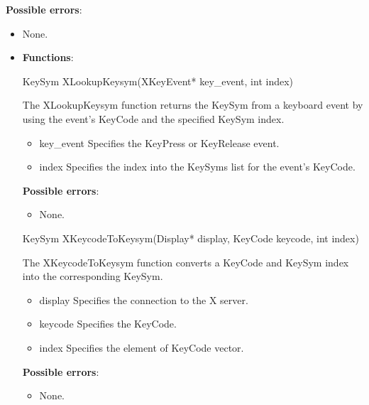 \documentclass{report}
\begin{document}
\begin{itemize}
        \textbf{Possible errors}:
        \begin{itemize}
            \item None.
        \end{itemize}


    \end{itemize}

    \pagebreak 
    \begin{itemize}
    \item \textbf{Functions}:
        \begin{cppcode}
        KeySym XLookupKeysym(XKeyEvent* key_event, int index)
        \end{cppcode}
        \bigbreak \noindent
        The XLookupKeysym function returns the KeySym from a keyboard event by using the event's KeyCode and the specified KeySym index.
        \begin{itemize}
            \item key\_event Specifies the KeyPress or KeyRelease event.
            \item index Specifies the index into the KeySyms list for the event’s KeyCode.
        \end{itemize}
        \textbf{Possible errors}:
        \begin{itemize}
            \item None.
        \end{itemize}

        \begin{cppcode}
        KeySym XKeycodeToKeysym(Display* display, KeyCode keycode, int index)
        \end{cppcode}
        \bigbreak \noindent
        The XKeycodeToKeysym function converts a KeyCode and KeySym index into the corresponding KeySym.
        \begin{itemize}
            \item display Specifies the connection to the X server.
            \item keycode Specifies the KeyCode.
            \item index Specifies the element of KeyCode vector.
        \end{itemize}

        \textbf{Possible errors}:
        \begin{itemize}
            \item None.
        \end{itemize}


\end{itemize}
\end{document}
